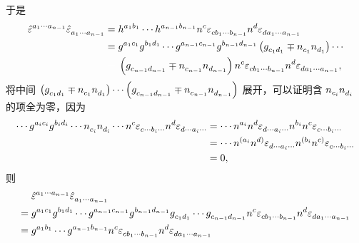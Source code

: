 \begin{xiti}
\begin{zm}
		于是
		\begin{align*}
		\tensor{\hat{\varepsilon}}{^{a_1 \cdots a_{n-1} }} \tensor{\hat{\varepsilon}}{_{ a_1 \cdots a_{n-1} }} &= \tensor{h}{^{a_1 b_1}} \cdots \tensor{h}{^{a_{n-1} b_{n-1} }} \tensor{n}{^c} \tensor{\varepsilon}{_{c b_1 \cdots b_{n-1} }} \tensor{n}{^d} \tensor{\varepsilon}{_{ d a_1 \cdots a_{n-1} }}\\
		&= \tensor{g}{^{a_1 c_1}} \tensor{g}{^{b_1 d_1}} \cdots \tensor{g}{^{a_{n-1} c_{n-1}}} \tensor{g}{^{b_{n-1} d_{n-1}}} \left( \tensor{g}{_{c_1 d_1}} \mp \tensor{n}{_{c_1}} \tensor{n}{_{d_{1}}} \right) \cdots\\
		&\;{\color{white} =}\; \left( \tensor{g}{_{c_{n-1} d_{n-1}}} \mp \tensor{n}{_{c_{n-1}}} \tensor{n}{_{d_{n-1}}} \right) \tensor{n}{^c} \tensor{\varepsilon}{_{c b_1 \cdots b_{n-1}}} \tensor{n}{^d} \tensor{\varepsilon}{_{d a_1 \cdots a_{n-1}}},
		\end{align*}
		将中间 $\left(\tensor{g}{_{c_1 d_1}} \mp \tensor{n}{_{c_1}} \tensor{n}{_{d_1}}\right) \cdots \left(\tensor{g}{_{c_{n-1} d_{n-1}}} \mp \tensor{n}{_{c_{n-1}}} \tensor{n}{_{d_{n-1}}}\right)$ 展开，可以证明含 $\tensor{n}{_{c_i}} \tensor{n}{_{d_i}}$ 的项全为零，因为
		\begin{align*}
		\cdots \tensor{g}{^{a_i c_i}} \tensor{g}{^{b_i d_i}} \cdots \tensor{n}{_{c_i}} \tensor{n}{_{d_i}} \cdots \tensor{n}{^c} \tensor{\varepsilon}{_{c \cdots b_i \cdots}} \tensor{n}{^d} \tensor{\varepsilon}{_{d \cdots a_i \cdots}} &= \cdots \tensor{n}{^{a_i}} \tensor{n}{^d} \tensor{\varepsilon}{_{d\cdots a_i \cdots}} \tensor{n}{^{b_i}} \tensor{n}{^c} \tensor{\varepsilon}{_{c \cdots b_i \cdots}}\\
		&= \cdots \tensor{n}{^{(a_i}} \tensor{n}{^{d)}} \tensor{\varepsilon}{_{d\cdots a_i \cdots}} \tensor{n}{^{(b_i}} \tensor{n}{^{c)}} \tensor{\varepsilon}{_{c \cdots b_i \cdots}}\\
		&= 0,
		\end{align*}
		则
		\begin{align*}
		&\;\tensor{\hat{\varepsilon}}{^{a_1 \cdots a_{n-1} }} \tensor{\hat{\varepsilon}}{_{ a_1 \cdots a_{n-1} }}\\
		=&\; \tensor{g}{^{a_1 c_1}} \tensor{g}{^{b_1 d_1}} \cdots \tensor{g}{^{a_{n-1} c_{n-1}}} \tensor{g}{^{b_{n-1} d_{n-1}}} \tensor{g}{_{c_1 d_1}} \cdots \tensor{g}{_{c_{n-1} d_{n-1}}} \tensor{n}{^c} \tensor{\varepsilon}{_{c b_1 \cdots b_{n-1}}} \tensor{n}{^d} \tensor{\varepsilon}{_{d a_1 \cdots a_{n-1}}}\\
		=&\; \tensor{g}{^{a_1 b_1}} \cdots \tensor{g}{^{a_{n-1} b_{n-1}}} \tensor{n}{^c} \tensor{\varepsilon}{_{c b_1 \cdots b_{n-1}}} \tensor{n}{^d} \tensor{\varepsilon}{_{d a_1 \cdots a_{n-1}}}\\

\end{align*}
\end{zm}
\end{xiti}
